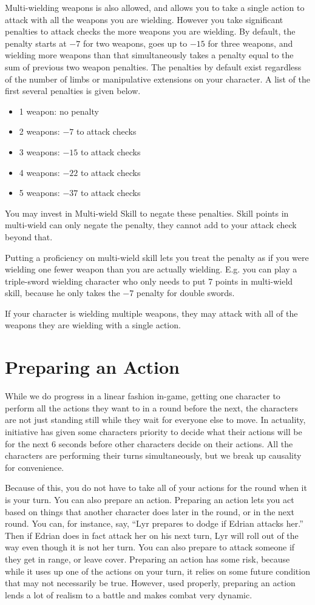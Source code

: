Multi-wielding weapons is also allowed, and allows you to take a single action to attack with all the weapons you are wielding. However you take significant penalties to attack checks the more weapons you are wielding. By default, the penalty starts at $-7$ for two weapons, goes up to $-15$ for three weapons, and wielding more weapons than that simultaneously takes a penalty equal to the sum of previous two weapon penalties. The penalties by default exist regardless of the number of limbs or manipulative extensions on your character. A list of the first several penalties is given below.
\begin{itemize}
\item 1 weapon: no penalty
\item 2 weapons: $-7$ to attack checks 
\item 3 weapons: $-15$ to attack checks 
\item 4 weapons: $-22$ to attack checks 
\item 5 weapons: $-37$ to attack checks
\end{itemize}
You may invest in Multi-wield Skill to negate these penalties. Skill points in multi-wield can only negate the penalty, they cannot add to your attack check beyond that.

Putting a proficiency on multi-wield skill lets you treat the penalty as if you were wielding one fewer weapon than you are actually wielding. E.g. you can play a triple-sword wielding character who only needs to put 7 points in multi-wield skill, because he only takes the $-7$ penalty for double swords.

If your character is wielding multiple weapons, they may attack with all of the weapons they are wielding with a single action.

\section{Preparing an Action}
While we do progress in a linear fashion in-game, getting one character to perform all the actions they want to in a round before the next, the characters are not just standing still while they wait for everyone else to move. In actuality, initiative has given some characters priority to decide what their actions will be for the next 6 seconds before other characters decide on their actions. All the characters are performing their turns simultaneously, but we break up causality for convenience.

Because of this, you do not have to take all of your actions for the round when it is your turn. You can also prepare an action. Preparing an action lets you act based on things that another character does later in the round, or in the next round. You can, for instance, say, ``Lyr prepares to dodge if Edrian attacks her.'' Then if Edrian does in fact attack her on his next turn, Lyr will roll out of the way even though it is not her turn. You can also prepare to attack someone if they get in range, or leave cover. Preparing an action has some risk, because while it uses up one of the actions on your turn, it relies on some future condition that may not necessarily be true. However, used properly, preparing an action lends a lot of realism to a battle and makes combat very dynamic.

